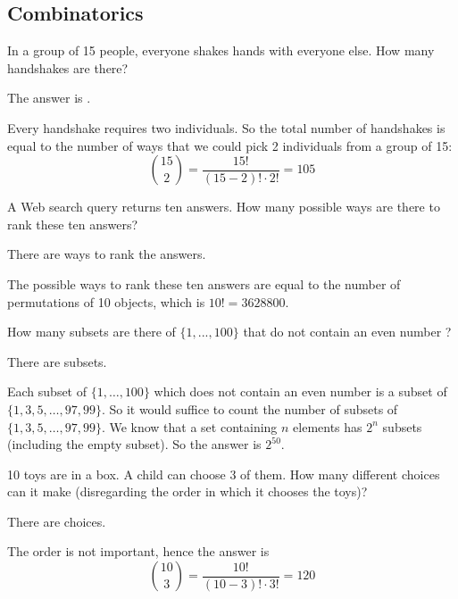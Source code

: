 \subsection*{Combinatorics}

\begin{question}
In a group of 15 people, everyone shakes hands with everyone else.  How many handshakes are there? 
\begin{solution}
The answer is .
\end{solution}
Every handshake requires two individuals. So the total number of handshakes is equal to the number of ways that we could pick 2 individuals from a group of 15:
\[
\binom{15}{2} = \frac{15!}{(15 - 2)! \cdot 2!} = 105
\]
\end{question}

\begin{question}
A Web search query returns ten answers. How many possible ways are there to rank these ten answers?
\begin{solution}
There are  ways to rank the answers.
\end{solution}
The possible ways to rank these ten answers are equal to the number of permutations of 10 objects, which is $10! = 3628800$.
\end{question}

\begin{question}
How many subsets are there of $\{1, ... , 100\}$ that do not contain an even number ? 
\begin{solution}
There are  subsets.
\end{solution}
Each subset of $\{1 , \ldots , 100\}$ which does not contain an even number is a subset of $\{1, 3, 5, \ldots , 97, 99\}$. So it would suffice to count the number of subsets of $\{1, 3, 5, \ldots , 97, 99\}$. We know that a set containing $n$ elements has $2^n$ subsets (including the empty subset). So the answer is $2^{50}$.
\end{question}

\begin{question}
10 toys are in a box.  A child can choose 3 of them.  How many different choices can it make (disregarding the order in which it chooses the toys)?  
\begin{solution}
There are  choices.
\end{solution}
The order is not important, hence the answer is
\[
\binom{10}{3} = \frac{10!}{(10-3)! \cdot 3!} = 120
\]
\end{question}

